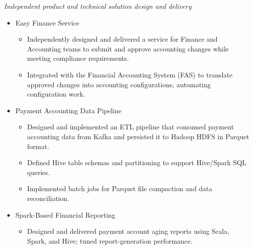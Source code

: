 \documentclass{resume}
\begin{document}
\textit{Independent product and technical solution design and delivery}
\begin{itemize}
  \item Easy Finance Service
  \begin{itemize}
    \item[。] Independently designed and delivered a service for Finance and Accounting teams to submit and approve accounting changes while meeting compliance requirements.
    \item[。] Integrated with the Financial Accounting System (FAS) to translate approved changes into accounting configurations, automating configuration work.
  \end{itemize}
  \item Payment Accounting Data Pipeline
  \begin{itemize}
    \item[。] Designed and implemented an ETL pipeline that consumed payment accounting data from Kafka and persisted it to Hadoop HDFS in Parquet format.
    \item[。] Defined Hive table schemas and partitioning to support Hive/Spark SQL queries.
    \item[。] Implemented batch jobs for Parquet file compaction and data reconciliation.
  \end{itemize}
  \item Spark-Based Financial Reporting
  \begin{itemize}
    \item[。] Designed and delivered payment account aging reports using Scala, Spark, and Hive; tuned report-generation performance.
  \end{itemize}
\end{itemize}
\end{document}
